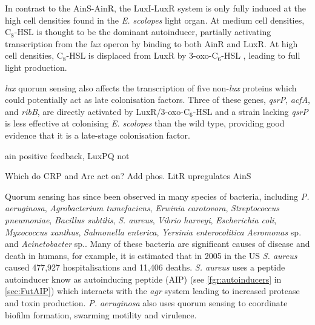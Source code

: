 In contrast to the AinS-AinR, the LuxI-LuxR system is only fully induced at the high cell densities found in the \textit{E. scolopes} light organ. At medium cell densities, C$_8$-HSL  is thought to be the dominant autoinducer, partially activating transcription from the \textit{lux} operon by binding to both AinR and LuxR\cite{Lupp2003}. At high cell densities, C$_8$-HSL  is displaced from LuxR by 3-oxo-C$_6$-HSL , leading to full light production.

\textit{lux} quorum sensing also affects the transcription of five non-\textit{lux} proteins which could potentially act as late colonisation factors\cite{Callahan2000,Qin2007}. Three of these genes, \textit{qsrP}, \textit{acfA}, and \textit{ribB}, are directly activated by LuxR/3-oxo-C$_6$-HSL\cite{Qin2007} and a strain lacking \textit{qsrP} is less effective at colonising \textit{E. scolopes} than the wild type, providing good evidence that it is a late-stage colonisation factor\cite{Callahan2000}.



ain positive feedback, LuxPQ not\cite{Lupp2004}

Which do CRP and Arc act on?
Add phos.
LitR upregulates AinS\cite{Lupp2004}





Quorum sensing has since been observed in many species of bacteria, including \textit{P. aeruginosa}, \textit{Agrobacterium tumefaciens}, \textit{Erwinia carotovora}, \textit{Streptococcus pneumoniae}, \textit{Bacillus subtilis}, \textit{S. aureus}, \textit{Vibrio harveyi}, \textit{Escherichia coli}, \textit{Myxococcus xanthus}, \textit{Salmonella enterica}, \textit{Yersinia enterocolitica}  \textit{Aeromonas} sp. and \textit{Acinetobacter} sp.\cite{Miller2001,Fuqua1994,Waters2005,Atkinson2006,Chan2011,Sauer2002,Michael2001,Ahmer2004,Nealson1970}. 
Many of these bacteria are significant causes of disease and death in humans, for example, it is estimated that in 2005 in the US \textit{S. aureus} caused 477,927 hospitalisations and 11,406 deaths\cite{Klein2007}. \textit{S. aureus} uses a peptide autoinducer know as autoinducing peptide (AIP) (see \ref{fgr:autoinducers} in \ref{sec:FutAIP}) which interacts with the \textit{agr} system leading to increased protease and toxin production\cite{Antunes2010}. \textit{P. aeruginosa} also uses quorum sensing to coordinate biofilm formation, swarming motility and virulence.






